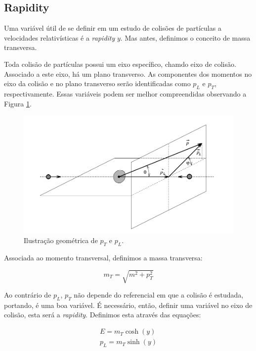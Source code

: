 \subsection{Rapidity} \label{variaveis}

Uma variável útil de se definir em um estudo de colisões de partículas a velocidades relativísticas é a {\it rapidity} $y$. Mas antes,
definimos o conceito de massa transversa.
\par
Toda colisão de partículas possui um eixo específico, chamdo eixo de colisão. Associado a este eixo, há um plano transverso. As componentes
dos momentos no eixo da colisão e no plano transverso serão identificadas como $p_{L}$ e $p_{T}$, respectivamente. Essas variáveis podem ser
melhor compreendidas observando a Figura \ref{fig:geometria}.

\begin{figure}[!h]
 \includegraphics[scale=0.35]{Introducao/geometriamomento.png}
 \caption{Ilustração geométrica de $p_T$ e $p_L$.}
 \label{fig:geometria}
\end{figure}


Associada ao momento transversal, definimos a massa transversa:

\begin{equation}
 m_{T}=\sqrt{m^2+p_{T}^2}
\end{equation}

Ao contrário de $p_{L}$, $p_{T}$ não depende do referencial em que a colisão é estudada, portando, é uma boa variável. É necessário, então,
definir uma variável no eixo de colisão, esta será a {\it rapidity}. Definimos esta através das equações:

\begin{subequations}
\begin{align}
 E=m_{T} \cosh{(y)} \\ p_{L}=m_{T} \sinh{(y)}
\end{align}
\end{subequations}

